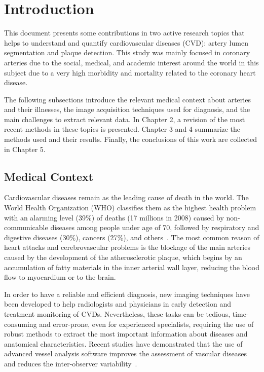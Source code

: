 \chapter{Introduction}
%

This document presents some contributions in two active research topics that helps to understand and quantify cardiovascular diseases (CVD): artery lumen segmentation and plaque detection. This study was mainly focused in coronary arteries due to the social, medical, and academic interest around the world in this subject due to a very high morbidity and mortality related to the coronary heart disease. 

The following subsections introduce the relevant medical context about arteries and their illnesses, the image acquisition techniques used for diagnosis, and the main challenges to extract relevant data. In Chapter 2, a revision of the most recent methods in these topics is presented. Chapter 3 and 4 summarize the methods used and their results. Finally, the conclusions of this work are collected in Chapter 5.

\section{Medical Context}
%

Cardiovascular diseases remain as the leading cause of death in the world. The World Health Organization (WHO) classifies them as the highest health problem with an alarming level (39\%) of deaths (17 millions in 2008) caused by non-communicable diseases among people under age of 70, followed by respiratory and digestive diseases (30\%), cancers (27\%), and others~\citep{WHO2011}. The most common reason of heart attacks and cerebrovascular problems is the blockage of the main arteries caused by the development of the atherosclerotic plaque, which begins by an accumulation of fatty materials in the inner arterial wall layer, reducing the blood flow to myocardium or to the brain.

In order to have a reliable and efficient diagnosis, new imaging techniques have been developed to help radiologists and physicians in early detection and treatment monitoring of CVDs. Nevertheless, these tasks can be tedious, time-consuming and error-prone, even for experienced specialists, requiring the use of robust methods to extract the most important information about diseases and anatomical characteristics. Recent studies have demonstrated that the use of advanced vessel analysis software improves the assessment of vascular diseases and reduces the inter-observer variability~\citep{DiCarli2007, Biermann2012}.

